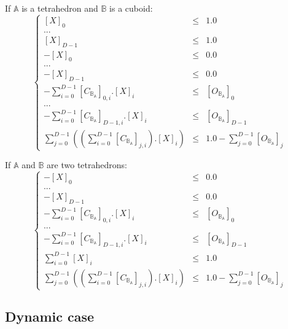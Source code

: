 \documentclass[12pt, a4paper]{article}
\begin{document}
If $\mathbb{A}$ is a tetrahedron and $\mathbb{B}$ is a cuboid:
\begin{equation}
\left\lbrace
\begin{array}{rcl}
\left[X\right]_0&\le&1.0\\
...\\
\left[X\right]_{D-1}&\le&1.0\\
-\left[X\right]_0&\le&0.0\\
...\\
-\left[X\right]_{D-1}&\le&0.0\\
-\sum_{i=0}^{D-1}\left[C_{\mathbb{B}_\mathbb{A}}\right]_{0,i}.\left[X\right]_i&\le&\left[O_{\mathbb{B}_\mathbb{A}}\right]_0\\
...\\
-\sum_{i=0}^{D-1}\left[C_{\mathbb{B}_\mathbb{A}}\right]_{D-1,i}.\left[X\right]_i&\le&\left[O_{\mathbb{B}_\mathbb{A}}\right]_{D-1}\\
\sum_{j=0}^{D-1}\left(\left(\sum_{i=0}^{D-1}\left[C_{\mathbb{B}_\mathbb{A}}\right]_{j,i}\right).\left[X\right]_i\right)&\le&1.0-\sum_{j=0}^{D-1}\left[O_{\mathbb{B}_\mathbb{A}}\right]_j
\end{array}
\right.
\end{equation}

If $\mathbb{A}$ and $\mathbb{B}$ are two tetrahedrons:
\begin{equation}
\left\lbrace
\begin{array}{rcl}
-\left[X\right]_0&\le&0.0\\
...\\
-\left[X\right]_{D-1}&\le&0.0\\
-\sum_{i=0}^{D-1}\left[C_{\mathbb{B}_\mathbb{A}}\right]_{0,i}.\left[X\right]_i&\le&\left[O_{\mathbb{B}_\mathbb{A}}\right]_0\\
...\\
-\sum_{i=0}^{D-1}\left[C_{\mathbb{B}_\mathbb{A}}\right]_{D-1,i}.\left[X\right]_i&\le&\left[O_{\mathbb{B}_\mathbb{A}}\right]_{D-1}\\
\sum_{i=0}^{D-1}\left[X\right]_i&\le&1.0\\
\sum_{j=0}^{D-1}\left(\left(\sum_{i=0}^{D-1}\left[C_{\mathbb{B}_\mathbb{A}}\right]_{j,i}\right).\left[X\right]_i\right)&\le&1.0-\sum_{j=0}^{D-1}\left[O_{\mathbb{B}_\mathbb{A}}\right]_j
\end{array}
\right.
\end{equation}

\subsection{Dynamic case}
\end{document}
